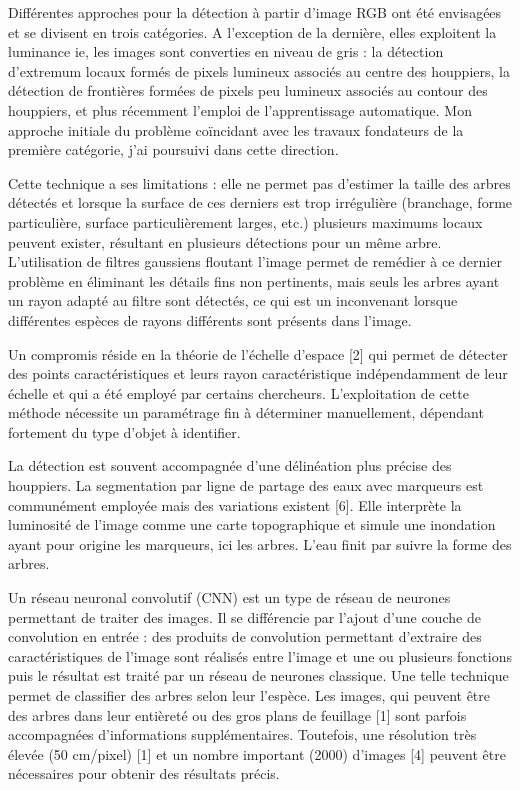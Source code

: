 \documentclass{article}
\begin{document}
Différentes approches pour la détection à partir d'image RGB ont été envisagées et se divisent en trois catégories. A l'exception de la dernière, elles exploitent la luminance ie, les images sont converties en niveau de gris : la détection d'extremum locaux formés de pixels lumineux associés au centre des houppiers, la détection de frontières formées de pixels peu lumineux associés au contour des houppiers, et plus récemment l'emploi de l'apprentissage automatique. Mon approche initiale du problème coïncidant avec les travaux fondateurs de la première catégorie, j'ai poursuivi dans cette direction. 

Cette technique a ses limitations : elle ne permet pas d'estimer la taille des arbres détectés et lorsque la surface de ces derniers est trop irrégulière (branchage, forme particulière, surface particulièrement larges, etc.) plusieurs maximums locaux peuvent exister, résultant en plusieurs détections pour un même arbre. L'utilisation de filtres gaussiens floutant l'image permet de remédier à ce dernier problème en éliminant les détails fins non pertinents, mais seuls les arbres ayant un rayon adapté au filtre sont détectés, ce qui est un inconvenant lorsque différentes espèces de rayons différents sont présents dans l'image. 

Un compromis réside en la théorie de l'échelle d'espace [2] qui permet de détecter des points caractéristiques et leurs rayon caractéristique indépendamment de leur échelle et qui a été employé par certains chercheurs. L'exploitation de cette méthode nécessite un paramétrage fin à déterminer manuellement, dépendant fortement du type d'objet à identifier.

La détection est souvent accompagnée d'une délinéation plus précise des houppiers. La segmentation par ligne de partage des eaux avec marqueurs est communément employée mais des variations existent [6]. Elle interprète la luminosité de l'image comme une carte topographique et simule une inondation ayant pour origine les marqueurs, ici les arbres. L'eau finit par suivre la forme des arbres.

Un réseau neuronal convolutif (CNN) est un type de réseau de neurones permettant de traiter des images. Il se différencie par l'ajout d'une couche de convolution en entrée : des produits de convolution permettant d'extraire des caractéristiques de l'image sont réalisés entre l'image et une ou plusieurs fonctions puis le résultat est traité par un réseau de neurones classique. Une telle technique permet de classifier des arbres selon leur l'espèce. Les images, qui peuvent être des arbres dans leur entièreté ou des gros plans de feuillage [1] sont parfois accompagnées d'informations supplémentaires. Toutefois, une résolution très élevée (50 cm/pixel) [1] et un nombre important (2000) d'images [4] peuvent être nécessaires pour obtenir des résultats précis.
\end{document}
